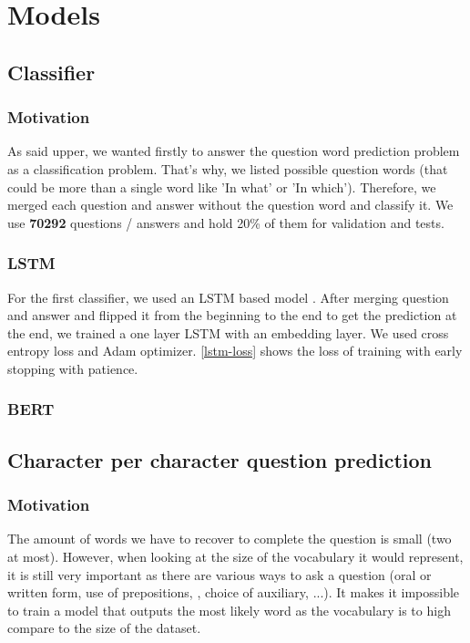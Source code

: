 \documentclass{article}
\begin{document}
\section{Models}

\subsection{Classifier}

\subsubsection{Motivation}

As said upper, we wanted firstly to answer the question word prediction problem as a classification problem. That's why, we listed possible question words (that could be more than a single word like 'In what' or 'In which'). Therefore, we merged each question and answer without the question word and classify it. We use \textbf{70292} questions / answers and hold 20\% of them for validation and tests.

\subsubsection{LSTM}

For the first classifier, we used an LSTM based model \cite{lstm1997}. After merging question and answer and flipped it from the beginning to the end to get the prediction at the end, we trained a one layer LSTM with an embedding layer. We used cross entropy loss and Adam optimizer. \ref{lstm-loss} shows the loss of training with early stopping with patience.

\subsubsection{BERT}

\subsection{Character per character question prediction}

\subsubsection{Motivation}
The amount of words we have to recover to complete the question is small (two at most). However, when looking at the size of the vocabulary it would represent, it is still very important as there are various ways to ask a question (oral or written form, use of prepositions, , choice of auxiliary, ...). It makes it impossible to train a model that outputs the most likely word as the vocabulary is to high compare to the size of the dataset.
\end{document}
